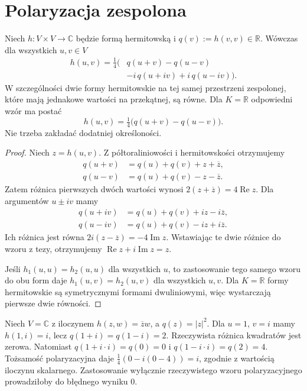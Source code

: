 \section{Polaryzacja zespolona}
\label{sec:lin12-polaryzacja}

\begin{twierdzenie}
\label{thm:lin12-polaryzacja}
Niech \(h\colon V\times V\to\mathbb C\)
będzie formą hermitowską i
\(q(v):=h(v,v)\in\mathbb R\).
Wówczas dla wszystkich \(u,v\in V\)
\[
 \begin{aligned}
 h(u,v)=\frac14\bigl(
 &q(u+v)-q(u-v)\\
 &-i\,q(u+iv)+i\,q(u-iv)\bigr).
 \end{aligned}
\]
W szczególności dwie formy hermitowskie
na tej samej przestrzeni zespolonej,
które mają jednakowe wartości na przekątnej,
są równe. Dla \(K=\mathbb R\) odpowiedni wzór
ma postać
\[
 h(u,v)=\tfrac14\bigl(q(u+v)-q(u-v)\bigr).
\]
Nie trzeba zakładać dodatniej określoności.
\end{twierdzenie}
\begin{proof}
Niech \(z=h(u,v)\).
Z półtoraliniowości i hermitowskości
otrzymujemy
\[
 \begin{aligned}
 q(u+v)&=q(u)+q(v)+z+\overline z,\\
 q(u-v)&=q(u)+q(v)-z-\overline z.
 \end{aligned}
\]
Zatem różnica pierwszych dwóch wartości
wynosi \(2(z+\overline z)=4\operatorname{Re}z\).
Dla argumentów \(u\pm iv\) mamy
\[
 \begin{aligned}
 q(u+iv)&=q(u)+q(v)+iz-i\overline z,\\
 q(u-iv)&=q(u)+q(v)-iz+i\overline z.
 \end{aligned}
\]
Ich różnica jest równa
\(2i(z-\overline z)=-4\operatorname{Im}z\).
Wstawiając te dwie różnice do wzoru z tezy,
otrzymujemy
\(\operatorname{Re}z+i\operatorname{Im}z=z\).

Jeśli \(h_1(u,u)=h_2(u,u)\)
dla wszystkich \(u\), to zastosowanie
tego samego wzoru do obu form
daje \(h_1(u,v)=h_2(u,v)\)
dla wszystkich \(u,v\).
Dla \(K=\mathbb R\)
formy hermitowskie są symetrycznymi
formami dwuliniowymi, więc wystarczają
pierwsze dwie równości.
\end{proof}

\begin{przyklad}
\label{prz:lin12-polaryzacja-i}
Niech \(V=\mathbb C\) z iloczynem
\(h(z,w)=\overline zw\), a
\(q(z)=|z|^2\).
Dla \(u=1\), \(v=i\)
mamy \(h(1,i)=i\), lecz
\(q(1+i)=q(1-i)=2\).
Rzeczywista różnica kwadratów jest zerowa.
Natomiast
\(q(1+i\cdot i)=q(0)=0\)
i \(q(1-i\cdot i)=q(2)=4\).
Tożsamość polaryzacyjna daje
\(\frac14(0-i(0-4))=i\),
zgodnie z wartością iloczynu skalarnego.
Zastosowanie wyłącznie rzeczywistego
wzoru polaryzacyjnego prowadziłoby
do błędnego wyniku \(0\).
\end{przyklad}


